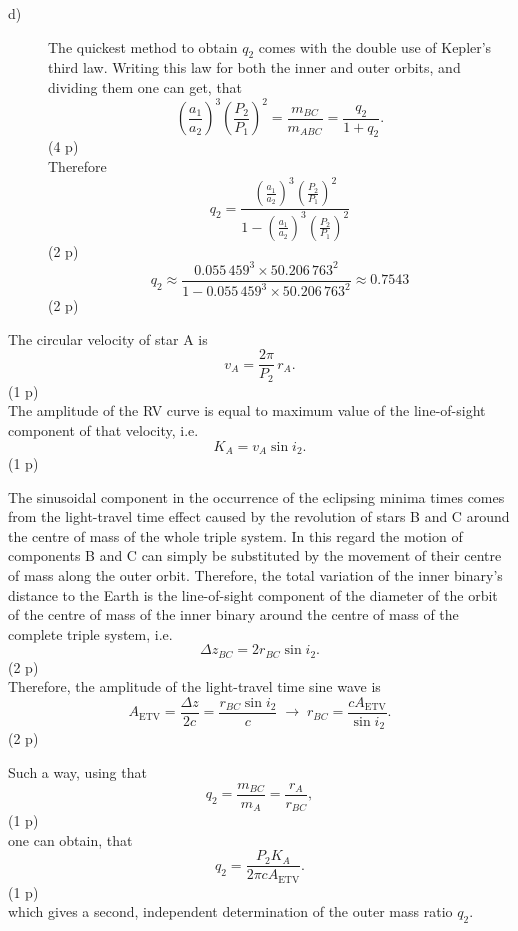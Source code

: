 \begin{description}
\begin{description}
  \item[d)] The quickest method to obtain $q_2$ comes with the double use of
    Kepler's third law. Writing this law for both the inner and outer
    orbits, and dividing them one can get, that
    \[ \left( \frac{a_1}{a_2} \right)^3 \left( \frac{P_2}{P_1} \right)^2
       = \frac{m_{BC}}{m_{ABC}} = \frac{q_2}{1 + q_2}.
       \tag*{(2.29)} \]
    \hfill(4 p)\\
    Therefore
    \[ q_2 = \frac{\left( \frac{a_1}{a_2} \right)^3
       \left( \frac{P_2}{P_1} \right)^2}
       {1 - \left( \frac{a_1}{a_2} \right)^3
       \left( \frac{P_2}{P_1} \right)^2}
       \tag*{(2.30)} \]
    \hfill(2 p)
    \[ q_2 \approx \frac{0.055\,459^3 \times 50.206\,763^2}
       {1 - 0.055\,459^3 \times 50.206\,763^2} \approx 0.7543
       \tag*{(2.31)} \]
    \hfill(2 p)
  \end{description}

\item[ii)] The circular velocity of star A is
  \[ v_A = \frac{2\pi}{P_2}\,r_A.
     \tag*{(2.32)} \]
  \hfill(1 p)\\
  The amplitude of the RV curve is equal to maximum value of the
  line-of-sight component of that velocity, i.e.
  \[ K_A = v_A \sin i_2.
     \tag*{(2.33)} \]
  \hfill(1 p)

  The sinusoidal component in the occurrence of the eclipsing minima times
  comes from the light-travel time effect caused by the revolution of stars
  B and C around the centre of mass of the whole triple system. In this
  regard the motion of components B and C can simply be substituted by the
  movement of their centre of mass along the outer orbit. Therefore, the
  total variation of the inner binary's distance to the Earth is the
  line-of-sight component of the diameter of the orbit of the centre of mass
  of the inner binary around the centre of mass of the complete triple
  system, i.e.
  \[ \Delta z_{BC} = 2 r_{BC} \sin i_2.
     \tag*{(2.34)} \]
  \hfill(2 p)\\
  Therefore, the amplitude of the light-travel time sine wave is
  \[ A_{\mathrm{ETV}} = \frac{\Delta z}{2c}
     = \frac{r_{BC} \sin i_2}{c}
     \;\rightarrow\;
     r_{BC} = \frac{c A_{\mathrm{ETV}}}{\sin i_2}.
     \tag*{(2.35)} \]
  \hfill(2 p)

  Such a way, using that
  \[ q_2 = \frac{m_{BC}}{m_A} = \frac{r_A}{r_{BC}},
     \tag*{(2.36)} \]
  \hfill(1 p)\\
  one can obtain, that
  \[ q_2 = \frac{P_2 K_A}{2\pi c A_{\mathrm{ETV}}}.
     \tag*{(2.37)} \]
  \hfill(1 p)\\
  which gives a second, independent determination of the outer mass ratio
  $q_2$.


\end{description}
